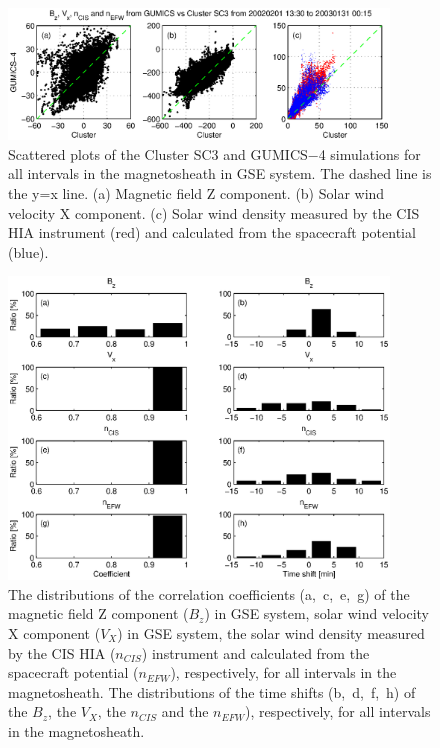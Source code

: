 \documentclass[linenumbers,draft]{agujournal}
\begin{document}
\pagebreak

\begin{figure}[h]
\centering
\includegraphics[width=0.9\textwidth,angle=0]{swe-2020-corr-f09.eps}
\caption{Scattered plots of the Cluster SC3 and GUMICS$-$4 simulations for all intervals in the magnetosheath in GSE system. The dashed line is the y=x line. (a) Magnetic field Z component. (b) Solar wind velocity X component. (c) Solar wind density measured by the CIS HIA instrument (red) and calculated from the spacecraft potential (blue).}
\label{fig:mshscatplot}
\end{figure}

\pagebreak

\begin{figure}[h]
\centering
\includegraphics[width=0.9\textwidth,angle=0]{swe-2020-corr-f10.eps}
\caption{The distributions of the correlation coefficients (a,~c,~e,~g) of the magnetic field Z component ($B_z$) in GSE system, solar wind velocity X component ($V_X$) in GSE system, the solar wind density measured by the CIS HIA ($n_{CIS}$) instrument and calculated from the spacecraft potential ($n_{EFW}$), respectively, for all intervals in the magnetosheath. The distributions of the time shifts (b,~d,~f,~h) of the $B_z$, the $V_X$, the $n_{CIS}$ and the $n_{EFW}$), respectively, for all intervals in the magnetosheath.}
\label{fig:mshcorrplot}
\end{figure}
\end{document}
